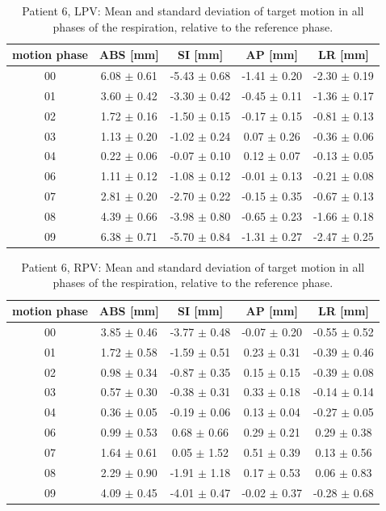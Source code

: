 \documentclass[type=dr, dr=rernat, accentcolor=tud7b,colorbacktitle, bigchapter, openright, twoside, 12pt ]{tudthesis}
\begin{document}

\begin{table}[H]
  \centering
  \caption{Patient 6, LPV: Mean and standard deviation of target motion in all phases of the respiration, relative to the reference phase.}
  \begin{tabular}{|c|c|c|c|c|}
    \hline\hline
    motion phase & ABS [mm] & SI [mm] & AP [mm] & LR [mm]\\
    \hline 
00& 6.08 $\pm$ 0.61& -5.43 $\pm$ 0.68& -1.41 $\pm$ 0.20& -2.30 $\pm$ 0.19 \\
01& 3.60 $\pm$ 0.42& -3.30 $\pm$ 0.42& -0.45 $\pm$ 0.11& -1.36 $\pm$ 0.17 \\
02& 1.72 $\pm$ 0.16& -1.50 $\pm$ 0.15& -0.17 $\pm$ 0.15& -0.81 $\pm$ 0.13 \\
03& 1.13 $\pm$ 0.20& -1.02 $\pm$ 0.24& 0.07 $\pm$ 0.26& -0.36 $\pm$ 0.06 \\
04& 0.22 $\pm$ 0.06& -0.07 $\pm$ 0.10& 0.12 $\pm$ 0.07& -0.13 $\pm$ 0.05 \\
06& 1.11 $\pm$ 0.12& -1.08 $\pm$ 0.12& -0.01 $\pm$ 0.13& -0.21 $\pm$ 0.08 \\
07& 2.81 $\pm$ 0.20& -2.70 $\pm$ 0.22& -0.15 $\pm$ 0.35& -0.67 $\pm$ 0.13 \\
08& 4.39 $\pm$ 0.66& -3.98 $\pm$ 0.80& -0.65 $\pm$ 0.23& -1.66 $\pm$ 0.18 \\
09& 6.38 $\pm$ 0.71& -5.70 $\pm$ 0.84& -1.31 $\pm$ 0.27& -2.47 $\pm$ 0.25 \\
        \hline\hline
  \end{tabular}
\end{table}

\begin{table}[H]
  \centering
  \caption{Patient 6, RPV: Mean and standard deviation of target motion in all phases of the respiration, relative to the reference phase.}
  \begin{tabular}{|c|c|c|c|c|}
    \hline\hline
    motion phase & ABS [mm] & SI [mm] & AP [mm] & LR [mm]\\
    \hline 
00& 3.85 $\pm$ 0.46& -3.77 $\pm$ 0.48& -0.07 $\pm$ 0.20& -0.55 $\pm$ 0.52 \\
01& 1.72 $\pm$ 0.58& -1.59 $\pm$ 0.51& 0.23 $\pm$ 0.31& -0.39 $\pm$ 0.46 \\
02& 0.98 $\pm$ 0.34& -0.87 $\pm$ 0.35& 0.15 $\pm$ 0.15& -0.39 $\pm$ 0.08 \\
03& 0.57 $\pm$ 0.30& -0.38 $\pm$ 0.31& 0.33 $\pm$ 0.18& -0.14 $\pm$ 0.14 \\
04& 0.36 $\pm$ 0.05& -0.19 $\pm$ 0.06& 0.13 $\pm$ 0.04& -0.27 $\pm$ 0.05 \\
06& 0.99 $\pm$ 0.53& 0.68 $\pm$ 0.66& 0.29 $\pm$ 0.21& 0.29 $\pm$ 0.38 \\
07& 1.64 $\pm$ 0.61& 0.05 $\pm$ 1.52& 0.51 $\pm$ 0.39& 0.13 $\pm$ 0.56 \\
08& 2.29 $\pm$ 0.90& -1.91 $\pm$ 1.18& 0.17 $\pm$ 0.53& 0.06 $\pm$ 0.83 \\
09& 4.09 $\pm$ 0.45& -4.01 $\pm$ 0.47& -0.02 $\pm$ 0.37& -0.28 $\pm$ 0.68 \\
        \hline\hline
  \end{tabular}
\end{table}
\end{document}
